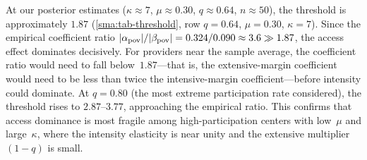 \begin{remark}\label{sma:rem-threshold-empirical}
  At our posterior estimates
  ($\kappa \approx 7$, $\mu \approx 0.30$, $q \approx 0.64$,
  $n \approx 50$), the threshold is approximately $1.87$
  (\cref{sma:tab-threshold}, row $q = 0.64$, $\mu = 0.30$,
  $\kappa = 7$). Since the empirical coefficient ratio
  $|\alpha_{\textup{pov}}|/|\beta_{\textup{pov}}|
  = 0.324/0.090 \approx 3.6 \gg 1.87$, the access effect dominates
  decisively. For providers near the sample average, the coefficient
  ratio would need to fall below~$1.87$---that is, the extensive-margin
  coefficient would need to be less than twice the intensive-margin
  coefficient---before intensity could dominate. At $q = 0.80$
  (the most extreme participation rate considered), the threshold
  rises to $2.87$--$3.77$, approaching the empirical ratio. This
  confirms that access dominance is most fragile among high-participation
  centers with low~$\mu$ and large~$\kappa$, where the intensity
  elasticity is near unity and the extensive multiplier $(1-q)$ is small.
\end{remark}
